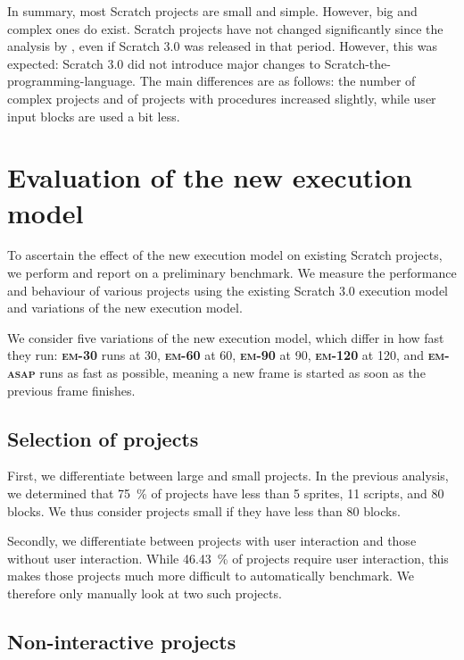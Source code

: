 \documentclass[../main]{subfiles}
\begin{document}
In summary, most Scratch projects are small and simple.
However, big and complex ones do exist.
Scratch projects have not changed significantly since the analysis by \textcite{aivaloglouHowKidsCode2016}, even if Scratch 3.0 was released in that period.
However, this was expected: Scratch 3.0 did not introduce major changes to Scratch-the-programming-language.
The main differences are as follows: the number of complex projects and of projects with procedures increased slightly, while user input blocks are used a bit less.

\section{Evaluation of the new execution model}\label{sec:evaluation-of-the-new-execution-model}

To ascertain the effect of the new execution model on existing Scratch projects, we perform and report on a preliminary benchmark.
We measure the performance and behaviour of various projects using the existing Scratch 3.0 execution model and variations of the new execution model.

We consider five variations of the new execution model, which differ in how fast they run: \textbf{\textsc{em-30}} runs at \qty{30}{\fps}, \textbf{\textsc{em-60}} at \qty{60}{\fps}, \textbf{\textsc{em-90}} at \qty{90}{\fps}, \textbf{\textsc{em-120}} at \qty{120}{\fps}, and \textbf{\textsc{em-asap}} runs as fast as possible, meaning a new frame is started as soon as the previous frame finishes.

\subsection{Selection of projects}\label{subsec:selection-of-projects}

First, we differentiate between large and small projects.
In the previous analysis, we determined that \qty{75}{\percent} of projects have less than 5 sprites, 11 scripts, and 80 blocks.
We thus consider projects small if they have less than 80 blocks.

Secondly, we differentiate between projects with user interaction and those without user interaction.
While \qty{46.43}{\percent} of projects require user interaction, this makes those projects much more difficult to automatically benchmark.
We therefore only manually look at two such projects.

\subsection{Non-interactive projects}\label{subsec:non-interactive-projects}
\end{document}
